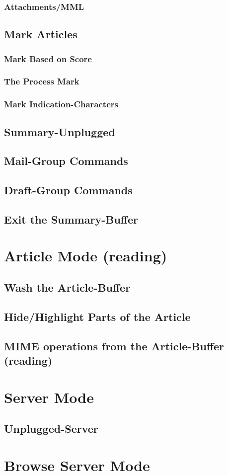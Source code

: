 \documentclass{article}
\begin{document}
        \subsubsection*{Attachments/MML}
        \MsgCompositionMML
    \subsection*{Mark Articles}
    \MarkArticlesGeneral
        \subsubsection*{Mark Based on Score}
        \MarkByScore
        \subsubsection*{The Process Mark}
        \ProcessMark
        \subsubsection*{Mark Indication-Characters}
        \MarkCharacters
%
    \subsection*{Summary-Unplugged}
    \SummaryUnplugged
    \subsection*{Mail-Group Commands}
    \MailGroups
    \subsection*{Draft-Group Commands}
    \DraftGroup
    \subsection*{Exit the Summary-Buffer}
    \ExitSummary
%
%
\section*{Article Mode (reading)}
\ArticleModeGeneral
    \subsection*{Wash the Article-Buffer}
    \WashArticle
    \subsection*{Hide/Highlight Parts of the Article}
    \HideHighlightArticle
    \subsection*{MIME operations from the Article-Buffer (reading)}
    \MIMEArticleMode
%
%
\section*{Server Mode}
\ServerMode
    \subsection*{Unplugged-Server}
    \ServerUnplugged
%
%
\section*{Browse Server Mode}
\BrowseServer

\vspace*{\fill}
\Copyright
\end{document}
